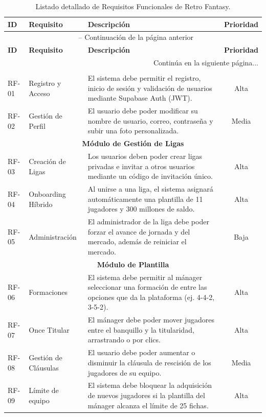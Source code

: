 \begin{center}
\small
\begin{longtable}{|l|p{3.5cm}|p{7cm}|c|}
    \caption{Listado detallado de Requisitos Funcionales de Retro Fantasy.}
    \label{tab:requisitos_funcionales} \\
    \hline
    \textbf{ID} & \textbf{Requisito} & \textbf{Descripción} & \textbf{Prioridad} \\
    \hline
    \endfirsthead

    \multicolumn{4}{c}{{\tablename\ \thetable{} -- Continuación de la página anterior}} \\
    \hline
    \textbf{ID} & \textbf{Requisito} & \textbf{Descripción} & \textbf{Prioridad} \\
    \hline
    \endhead


    \hline
    \multicolumn{4}{|r|}{{Continúa en la siguiente página...}} \\
    \hline
    \endfoot

    \hline
    \endlastfoot

    \multicolumn{4}{|c|}{\textbf{Módulo de Usuarios y Autenticación}} \\
    \hline
    RF-01 & Registro y Acceso & El sistema debe permitir el registro, inicio de sesión y validación de usuarios mediante Supabase Auth (JWT). & Alta \\ \hline
    RF-02 & Gestión de Perfil & El usuario debe poder modificar su nombre de usuario, correo, contraseña y subir una foto personalizada. & Media \\ \hline
    
    \multicolumn{4}{|c|}{\textbf{Módulo de Gestión de Ligas}} \\
    \hline
    RF-03 & Creación de Ligas & Los usuarios deben poder crear ligas privadas e invitar a otros usuarios mediante un código de invitación único. & Alta \\ \hline
    RF-04 & Onboarding Híbrido & Al unirse a una liga, el sistema asignará automáticamente una plantilla de 11 jugadores y 300 millones de saldo. & Alta \\ \hline
    RF-05 & Administración & El administrador de la liga debe poder forzar el avance de jornada y del mercado, además de reiniciar el mercado. & Baja \\ \hline
    
    \multicolumn{4}{|c|}{\textbf{Módulo de Plantilla}} \\
    \hline
    RF-06 & Formaciones & El sistema debe permitir al mánager seleccionar una formación de entre las opciones que da la plataforma (ej. 4-4-2, 3-5-2). & Alta \\ \hline
    RF-07 & Once Titular & El mánager debe poder mover jugadores entre el banquillo y la titularidad, arrastrando o por clics. & Alta \\ \hline
    RF-08 & Gestión de Cláusulas & El usuario debe poder aumentar o disminuir la cláusula de rescisión de los jugadores de su equipo. & Media \\ \hline
    RF-09 & Límite de equipo & El sistema debe bloquear la adquisición de nuevos jugadores si la plantilla del mánager alcanza el límite de 25 fichas. & Alta \\ \hline
    

\end{longtable}
\end{center}

